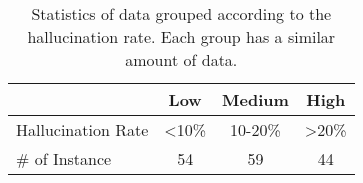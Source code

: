 \begin{table}[t]
    \centering
    \small
    \begin{tabular}{lccc}
        \toprule
          & Low & Medium & High\\
        \midrule
        Hallucination Rate & <10\% & 10-20\% & >20\%\\
        \# of Instance & 54 & 59 & 44\\
        \bottomrule
    \end{tabular}
    \caption{
     Statistics of data grouped according to the hallucination rate. Each group has a similar amount of data.
    }
    \label{tb:statistic_hallu_rate}
\end{table}